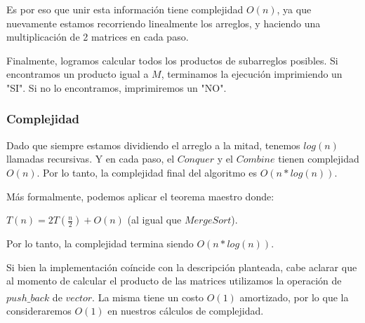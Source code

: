 Es por eso que unir esta información tiene complejidad $O(n)$, ya que nuevamente estamos recorriendo linealmente los arreglos, y haciendo una multiplicación de 2 matrices en cada paso.

Finalmente, logramos calcular todos los productos de subarreglos posibles. Si encontramos un producto igual a $M$, terminamos la ejecución imprimiendo un "SI". Si no lo encontramos, imprimiremos un "NO".
\subsubsection{Complejidad}
Dado que siempre estamos dividiendo el arreglo a la mitad, tenemos $log(n)$ llamadas recursivas. Y en cada paso, el $Conquer$ y el $Combine$ tienen complejidad $O(n)$. Por lo tanto, la complejidad final del algoritmo es $O(n * log(n))$.

Más formalmente, podemos aplicar el teorema maestro donde:

$T(n)=2T\left({\frac {n}{2}}\right)+O(n)$	 (al igual que $Merge Sort$).

Por lo tanto, la complejidad termina siendo $O(n * log(n))$.

Si bien la implementación coíncide con la descripción planteada, cabe aclarar que al momento de calcular el producto de las matrices utilizamos la operación de $push\_back$ \textsuperscript{\cite{pushback}} de $vector$. La misma tiene un costo $O(1)$ amortizado, por lo que la consideraremos $O(1)$ en nuestros cálculos de complejidad.